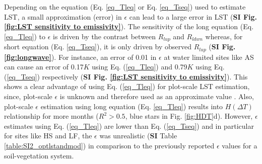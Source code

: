 \documentclass[fleqn,10pt]{wlscirep}
\begin{document}
Depending on the equation (Eq. \ref{eq_Tleq} or Eq. \ref{eq_Tseq}) used to estimate LST, a small approximation (error) in $\epsilon$ can lead to a large error in LST (\textbf{SI Fig. \ref{fig:LST sensitivity to emissivity}}). The sensitivity of the long equation (Eq. \ref{eq_Tleq}) to $\epsilon$ is driven by the contrast between $R_{lup}$ and $R_{ldwn}$ whereas, for short equation (Eq. \ref{eq_Tseq}), it is only driven by observed $R_{lup}$ (\textbf{SI Fig. \ref{fig:longwave}}). For instance, an error of 0.01 in $\epsilon$ at water limited sites like AS can cause an error of 0.17$K$ using Eq. (\ref{eq_Tleq}) and 0.79$K$ using Eq. (\ref{eq_Tseq}) respectively (\textbf{SI Fig. \ref{fig:LST sensitivity to emissivity}}). This shows a clear advantage of using Eq. (\ref{eq_Tleq}) for plot-scale LST estimation, since, plot-scale $\epsilon$ is unknown and therefore used as an approximate value \cite{mallick2018bridging}. Also, plot-scale $\epsilon$ estimation using long equation (Eq. \ref{eq_Tleq}) results into $H(\Delta T)$ relationship for more months ($R^{2} > 0.5$, blue stars in Fig. \ref{fig:HDT}d). However, $\epsilon$ estimates using Eq. (\ref{eq_Tleq}) are lower than Eq. (\ref{eq_Tseq}) and in particular for sites like HS and LF, the $\epsilon$ was unrealistic (\textbf{SI} Table \ref{table:SI2_optlstandmod}) in comparison to the previously reported  $\epsilon$ values for a soil-vegetation system\cite{sugita_optimal_1996-1,snyder1998classification}. 
\end{document}
